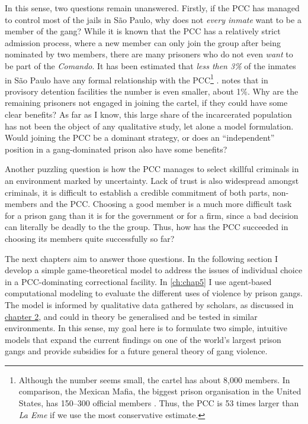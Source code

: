 In this sense, two questions remain unanswered. Firstly, if the PCC has managed to control most of the jails in S\~{a}o Paulo, why does not \textit{every inmate} want to be a member of the gang? While it is known that the PCC has a relatively strict admission process, where a new member can only join the group after being nominated by two members, there are many prisoners who do not even \textit{want} to be part of the \textit{Comando}. It has been estimated that 
\textit{less then 3\%} of the inmates in S\~{a}o Paulo have any formal relationship with the PCC\footnote{Although the number seems small, the cartel has about 8,000 members. In comparison, the Mexican Mafia, the biggest prison organisation in the United States, has 150--300 official members \citep[703]{skarbek2011governance}. Thus, the PCC is 53 times larger than \textit{La Eme}  if we use the most conservative estimate.} \citep[]{bbc2013pcc, veja2013crescimentopcc}. \citep[98]{biondi2007relacoes} notes that in provisory detention facilities the number is even smaller, about 1\%. Why are the remaining prisoners not engaged in joining the cartel, if they could have some clear benefits? As far as I know, this large share of the incarcerated population has not been the object of any qualitative study, let alone a model formulation. Would joining the PCC be a dominant strategy, or does an ``independent'' position in a gang-dominated prison also have some benefits?

Another puzzling question is how the PCC manages to select skillful criminals in an environment marked by uncertainty. Lack of trust is also widespread amongst criminals, it is difficult to establish a credible commitment of both parts, non-members and the PCC. Choosing a good member is a much more difficult task for a prison gang than it is for the government or for a firm, since a bad decision can literally be deadly to the the group. Thus, how has the PCC succeeded in choosing its members quite successfully so far?


The next chapters aim to answer those questions. In the following section I develop a simple game-theoretical model to address the issues of individual choice in a PCC-dominating correctional facility. In \autoref{ch:chap5} I use agent-based computational modeling to evaluate the different uses of violence by prison gangs. The model is informed by qualitative data gathered by scholars, as discussed in \hyperlink{page.17}{chapter 2}, and could in theory be generalised and be tested in similar environments. In this sense, my goal here is to formulate two simple, intuitive models that expand the current findings on one of the world's largest prison gangs and provide subsidies for a future general theory of gang violence.


